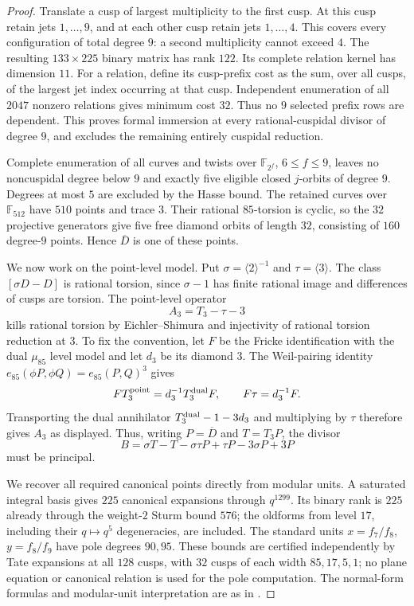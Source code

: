 \begin{proof}
Translate a cusp of largest multiplicity to the first cusp. At this cusp retain jets $1,\ldots,9$, and at each other cusp retain jets $1,\ldots,4$. This covers every configuration of total degree $9$: a second multiplicity cannot exceed $4$. The resulting $133\times225$ binary matrix has rank $122$. Its complete relation kernel has dimension $11$. For a relation, define its cusp-prefix cost as the sum, over all cusps, of the largest jet index occurring at that cusp. Independent enumeration of all $2047$ nonzero relations gives minimum cost $32$. Thus no $9$ selected prefix rows are dependent. This proves formal immersion at every rational-cuspidal divisor of degree $9$, and excludes the remaining entirely cuspidal reduction.

Complete enumeration of all curves and twists over $\mathbb F_{2^f}$, $6\leq f\leq9$, leaves no noncuspidal degree below $9$ and exactly five eligible closed $j$-orbits of degree $9$. Degrees at most $5$ are excluded by the Hasse bound. The retained curves over $\mathbb F_{512}$ have $510$ points and trace $3$. Their rational $85$-torsion is cyclic, so the $32$ projective generators give five free diamond orbits of length $32$, consisting of $160$ degree-$9$ points. Hence $\overline D$ is one of these points.

We now work on the point-level model. Put $\sigma=\langle2\rangle^{-1}$ and $\tau=\langle3\rangle$. The class $[\sigma D-D]$ is rational torsion, since $\sigma-1$ has finite rational image and differences of cusps are torsion. The point-level operator
\[
 A_3=T_3-\tau-3
\]
kills rational torsion by Eichler--Shimura and injectivity of rational torsion reduction at $3$. To fix the convention, let $F$ be the Fricke identification with the dual $\mu_{85}$ level model and let $d_3$ be its diamond $3$. The Weil-pairing identity $e_{85}(\phi P,\phi Q)=e_{85}(P,Q)^3$ gives
\[
 F T_3^{\rm point}=d_3^{-1}T_3^{\rm dual}F,\qquad
 F\tau=d_3^{-1}F.
\]
Transporting the dual annihilator $T_3^{\rm dual}-1-3d_3$ and multiplying by $\tau$ therefore gives $A_3$ as displayed. Thus, writing $P=\overline D$ and $T=T_3P$, the divisor
\[
 B=\sigma T-T-\sigma\tau P+\tau P-3\sigma P+3P
\]
must be principal.

We recover all required canonical points directly from modular units. A saturated integral basis gives $225$ canonical expansions through $q^{1299}$. Its binary rank is $225$ already through the weight-$2$ Sturm bound $576$; the oldforms from level $17$, including their $q\mapsto q^5$ degeneracies, are included. The standard units $x=f_7/f_8$, $y=f_8/f_9$ have pole degrees $90,95$. These bounds are certified independently by Tate expansions at all $128$ cusps, with $32$ cusps of each width $85,17,5,1$; no plane equation or canonical relation is used for the pole computation. The normal-form formulas and modular-unit interpretation are as in \cite[Sections~2 and~2.1]{DvH}.


\end{proof}
